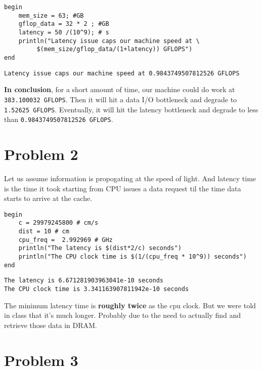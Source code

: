 \documentclass[11pt]{article}
\begin{document}
\begin{verbatim}
begin
    mem_size = 63; #GB
    gflop_data = 32 * 2 ; #GB
    latency = 50 /(10^9); # s
    println("Latency issue caps our machine speed at \
         $(mem_size/gflop_data/(1+latency)) GFLOPS")
end
\end{verbatim}

\begin{verbatim}
Latency issue caps our machine speed at 0.9843749507812526 GFLOPS
\end{verbatim}



\textbf{In conclusion}, for a short amount of time, our machine could do work at
\texttt{383.100032 GFLOPS}. Then it will hit a data I/O bottleneck and degrade to
\texttt{1.52625 GFLOPS}. Eventually, it will hit the latency bottleneck and degrade to
less than \texttt{0.9843749507812526 GFLOPS}.

\section{Problem 2}
\label{sec:org1ae881d}
Let us assume information is propogating at the speed of light. And latency time
is the time it took starting from CPU issues a data request til the time data
starts to arrive at the cache.

\begin{verbatim}
begin
    c = 29979245800 # cm/s
    dist = 10 # cm
    cpu_freq =  2.992969 # GHz
    println("The latency is $(dist*2/c) seconds")
    println("The CPU clock time is $(1/(cpu_freq * 10^9)) seconds")
end
\end{verbatim}

\begin{verbatim}
The latency is 6.671281903963041e-10 seconds
The CPU clock time is 3.341163907811942e-10 seconds
\end{verbatim}


The minimum latency time is \textbf{roughly twice} as the cpu clock. But we were told
in class that it's much longer. Probably due to the need to actually find and
retrieve those data in DRAM.

\section{Problem 3}
\label{sec:org08febe1}
\end{document}
